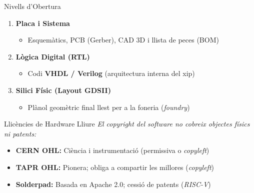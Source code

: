 \documentclass[catalan]{beamer}
\begin{document}
\begin{frame}{Nivells d'Obertura}
  \begin{enumerate}
    \item \textbf{Placa i Sistema}
      \begin{itemize}
        \item Esquemàtics, PCB (Gerber), CAD 3D i llista de peces (BOM)
      \end{itemize}
    \pause
    \vspace{0.25cm}
    \item \textbf{Lògica Digital (RTL)}
      \begin{itemize}
        \item Codi \textbf{VHDL / Verilog} (arquitectura interna del xip)
      \end{itemize}
    \pause
    \vspace{0.25cm}
    \item \textbf{Silici Físic (Layout GDSII)}
      \begin{itemize}
        \item Plànol geomètric final llest per a la foneria (\textit{foundry})
      \end{itemize}
  \end{enumerate}
\end{frame}

\begin{frame}{Llicències de Hardware Lliure}
  \textit{El copyright del software no cobreix objectes físics ni patents:}
  \vspace{0.4cm}
  \begin{itemize}
    \item \textbf{CERN OHL:} Ciència i instrumentació (permissiva o \textit{copyleft})
    \pause
    \vspace{0.25cm}
    \item \textbf{TAPR OHL:} Pionera; obliga a compartir les millores (\textit{copyleft})
    \pause
    \vspace{0.25cm}
    \item \textbf{Solderpad:} Basada en Apache 2.0; cessió de patents (\textit{RISC-V})
  \end{itemize}
\end{frame}
\end{document}
